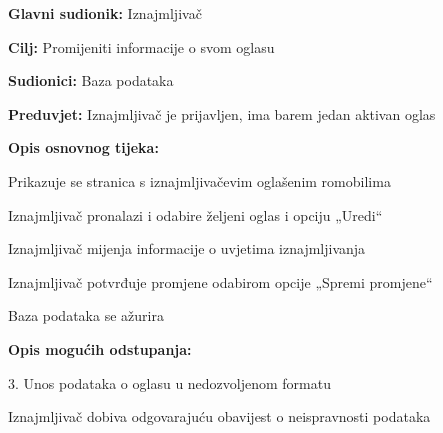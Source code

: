 						\noindent {}
						\begin{packed_item}
							
							\item \textbf{Glavni sudionik: }Iznajmljivač
							\item  \textbf{Cilj: }Promijeniti informacije o svom oglasu
							\item  \textbf{Sudionici: }Baza podataka
							\item  \textbf{Preduvjet: }Iznajmljivač je prijavljen, ima barem jedan aktivan oglas
							\item  \textbf{Opis osnovnog tijeka:}
							
							\item[] \begin{packed_enum}
								\item Prikazuje se stranica s iznajmljivačevim oglašenim romobilima
								\item Iznajmljivač pronalazi i odabire željeni oglas i opciju „Uredi“
								\item Iznajmljivač mijenja informacije o uvjetima iznajmljivanja
								\item Iznajmljivač potvrđuje promjene odabirom opcije „Spremi promjene“
								\item Baza podataka se ažurira
								
							\end{packed_enum}	
							\item  \textbf{Opis mogućih odstupanja:}
							
							\item[] \begin{packed_item}
								
								\item[3.a] 3.	Unos podataka o oglasu u nedozvoljenom formatu
								\item[] \begin{packed_enum}
									
									\item Iznajmljivač dobiva odgovarajuću obavijest o neispravnosti podataka
									
								\end{packed_enum}
								
							\end{packed_item}
						\end{packed_item}
						\noindent {}
